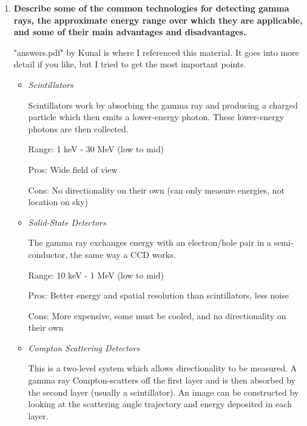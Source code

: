 \begin{enumerate}
{        --Michael
      }, therefore
      \begin{dmath}\boxed{
        \sigma_S = \frac{2kT_{\rm sys}}{A_e\sqrt{N(N-1)B\tau}}
      }\end{dmath}.

\item \textbf{Describe some of the common technologies for detecting gamma rays, the approximate
      energy range over which they are applicable, and some of their main advantages
      and disadvantages.}
      
       "answers.pdf" by Kunal is where I referenced this material. It goes into more detail if you like, but I tried to get the most important points.
      
      \begin{itemize}
      \item \emph{Scintillators}
      
      Scintillators work by absorbing the gamma ray and producing a charged particle which then emits a lower-energy photon. These lower-energy photons are then collected. 
      
      Range: 1 keV - 30 MeV (low to mid)
      
      Pros: Wide field of view
      
      Cons: No directionality on their own (can only measure energies, not location on sky)
      
      \item \emph{Solid-State Detectors}
      
      The gamma ray exchanges energy with an electron/hole pair in a semi-conductor, the same way a CCD works. 
      
      Range: 10 keV - 1 MeV (low to mid)
      
      Pros: Better energy and spatial resolution than scintillators, less noise
      
      Cons: More expensive, some must be cooled, and no directionality on their own
      
      \item \emph{Compton Scattering Detectors}
      
      This is a two-level system which allows directionality to be measured. A gamma ray Compton-scatters off the first layer and is then absorbed by the second layer (usually a scintillator). An image can be constructed by looking at the scattering angle trajectory and energy deposited in each layer.
      

\end{itemize}
\end{enumerate}
